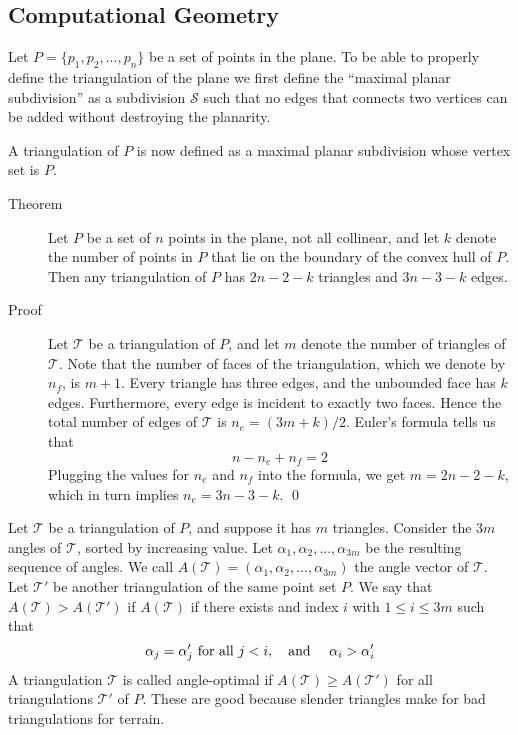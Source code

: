 \subsection{Computational Geometry}
Let $P = \{p_1, p_2, ..., p_n\}$ be a set of points in the plane. To be able to
properly define the triangulation of the plane we first define the ``maximal
planar subdivision'' as a subdivision $\mathcal{S}$ such that no edges that
connects two vertices can be added without destroying the planarity.

A triangulation of $P$ is now defined as a maximal planar subdivision whose
vertex set is $P$.

\begin{description}
\item[Theorem] Let $P$ be a set of $n$ points in the plane, not all collinear,
  and let $k$ denote the number of points in $P$ that lie on the boundary of the
  convex hull of $P$. Then any triangulation of $P$ has $2n−2−k$ triangles and
  $3n−3−k$ edges.

\item[Proof] Let $\mathcal{T}$ be a triangulation of $P$, and let $m$ denote the
  number of triangles of $\mathcal{T}$.  Note that the number of faces of the
  triangulation, which we denote by $n_f$, is $m+1$. Every triangle has three
  edges, and the unbounded face has $k$ edges.  Furthermore, every edge is
  incident to exactly two faces. Hence the total number of edges of
  $\mathcal{T}$ is $n_e = (3m+k)/2$. Euler's formula tells us that
  \[
    n-n_e+n_f = 2
  \]
  Plugging the values for $n_e$ and $n_f$ into the formula, we get $m=2n-2-k$,
  which in turn implies $n_e = 3n-3-k$. \qed
\end{description}


Let $\mathcal{T}$ be a triangulation of $P$, and suppose it has $m$
triangles. Consider the $3m$ angles of $\mathcal{T}$, sorted by increasing
value.  Let $\alpha_1, \alpha_2, ..., \alpha_{3m}$ be the resulting sequence of
angles. We call $A(\mathcal{T}) = (\alpha_1, \alpha_2, ..., \alpha_{3m})$ the
angle vector of $\mathcal{T}$.  Let $\mathcal{T}'$ be another triangulation of
the same point set $P$. We say that $A(\mathcal{T}) > A(\mathcal{T}')$ if
$A(\mathcal{T})$ if there exists and index $i$ with $1 \leq i \leq 3m$ such that
\[
\alpha_j = \alpha_j' \text{ for all } j < i, \text{\quad and \quad} \alpha_i >
\alpha_i'
\]
A triangulation $\mathcal{T}$ is called angle-optimal if $A(\mathcal{T}) \geq
A(\mathcal{T}')$ for all triangulations $\mathcal{T}'$ of $P$.  These are good
because slender triangles make for bad triangulations for terrain.

